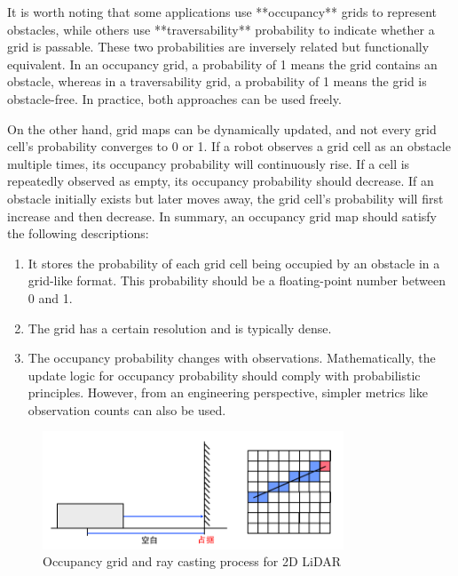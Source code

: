 It is worth noting that some applications use **occupancy** grids to represent obstacles, while others use **traversability** probability to indicate whether a grid is passable. These two probabilities are inversely related but functionally equivalent. In an occupancy grid, a probability of 1 means the grid contains an obstacle, whereas in a traversability grid, a probability of 1 means the grid is obstacle-free. In practice, both approaches can be used freely.  

On the other hand, grid maps can be dynamically updated, and not every grid cell's probability converges to 0 or 1. If a robot observes a grid cell as an obstacle multiple times, its occupancy probability will continuously rise. If a cell is repeatedly observed as empty, its occupancy probability should decrease. If an obstacle initially exists but later moves away, the grid cell's probability will first increase and then decrease. In summary, an occupancy grid map should satisfy the following descriptions:  

\begin{enumerate}  
	\item It stores the probability of each grid cell being occupied by an obstacle in a grid-like format. This probability should be a floating-point number between 0 and 1.  
	\item The grid has a certain resolution and is typically dense.  
	\item The occupancy probability changes with observations. Mathematically, the update logic for occupancy probability should comply with probabilistic principles. However, from an engineering perspective, simpler metrics like observation counts can also be used.  
\end{enumerate}  

\begin{figure}[!htp]  
	\centering  
	\includegraphics[width=0.8\textwidth]{resources/2d-lidar-mapping/grid-and-casting.pdf}  
	\caption{Occupancy grid and ray casting process for 2D LiDAR}  
	\label{fig:grid-and-casting}  
\end{figure}  

